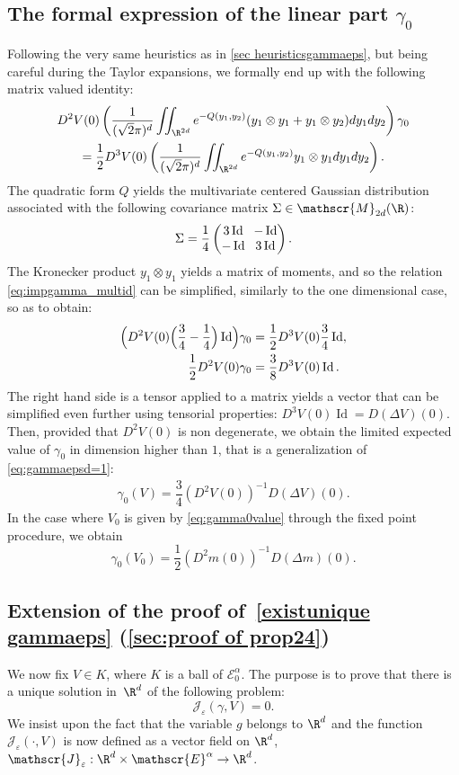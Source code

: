 \documentclass[JEP,XML,SOM,Unicode]{cedram}
\let\mathcal\mathscr
\newcommand{\cM}{\mathcal{M}}
\theoremstyle{plain}
\theoremstyle{definition}
\newcommand{\Je}{\mathcal{J}_\eps}
\let\eps\varepsilon
\let\ds\displaystyle
\newcommand{\Ea}{\mathcal{E}^\alpha}
\newcommand{\Eaz}{\mathcal{E}^\alpha_0}
\DeclareMathOperator{\Id}{Id}
\begin{document}
\subsection{The formal expression of the linear part $\gamma_0$}
Following the very same heuristics as in \cref{sec heuristicsgammaeps}, but being careful during the Taylor expansions, we formally end up with the following matrix valued identity:
\begin{multline}\label{eq:impgamma_multid}
D^2 V(0) \left(\dfrac{1}{(\sqrt{2}\pi)^d} \ds \iint_{\R^{2d}} e^{ -Q(y_1,y_2)} (y_1 \otimes y_1 + y_1 \otimes y_2) dy_1 dy_2 \right) \gamma_0 \\
=\dfrac{1}{2} D^3 V(0) \left (\dfrac{1}{(\sqrt{2}\pi)^d} \iint_{\R^{2d}} e^{ -Q(y_1,y_2) } y_1 \otimes y_1 dy_1 dy_2 \right).
\end{multline}
The quadratic form $Q$ yields the multivariate centered Gaussian distribution associated with the following covariance matrix $\Sigma \in \cM_{2d}(\R) $:
\[\arraycolsep3.5pt
\Sigma = \dfrac{1}{4} \begin{pmatrix}
3 \Id & - \Id \\
- \Id & 3 \Id
\end{pmatrix}.
\]
The Kronecker product $y_1 \otimes y_1 $ yields a matrix of moments, and so the relation \eqref{eq:impgamma_multid} can be simplified, similarly to the one dimensional case, so as to obtain:
\begin{align*}
\Bigl (D^2V(0) \Bigl(\dfrac{3}{4}-\dfrac{1}{4}\Bigr) \Id\Bigr) \gamma_0 &= \frac12 D^3V(0) \dfrac{3}{4} \Id, \\
\frac12 D^2V(0)\gamma_0 & = \frac38 D^3V(0) \Id.
\end{align*}
The right hand side is a tensor applied to a matrix yields a vector that can be simplified even further using tensorial properties:
$D^3 V(0) \Id = D (\Delta V)(0)$.
Then, provided that $D^2V(0)$ is non degenerate, we obtain the limited expected value of $\gamma_0$ in dimension higher than $1$, that is a generalization of \eqref{eq:gammaepsd=1}:
\begin{align*}
\gamma_0(V) = \dfrac{3}{4} \left (D^2 V(0)\right)^{-1} D (\Delta V)(0).
\end{align*}
In the case where $V_0$ is given by \eqref{eq:gamma0value} through the fixed point procedure, we obtain
\begin{equation*}
\gamma_0(V_0) = \dfrac{1}{2} \left (D^2 m(0)\right)^{-1} D (\Delta m)(0).
\end{equation*}

\subsection{Extension of the proof of~\cref{existunique gammaeps} (\cref{sec:proof of prop24})}
We now fix $V \in K$, where $K$ is a ball of $\Eaz$. The purpose is to prove that there is a unique solution in~$\R^d$ of the following problem:
\begin{equation}\label{eq:Je_0}
\Je(\gamma,V) = 0.
\end{equation}
We insist upon the fact that the variable $g$ belongs to $\R^d$ and the function $\Je(\cdot,V)$ is now defined as a vector field on $\R^d$, $\Je: \R^d \times \Ea \to \R^d$.
\end{document}
